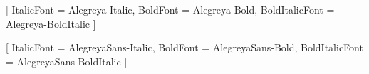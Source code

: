 



\usepackage[babelshorthands]{polyglossia}
\setmainlanguage[indentfirst=false]{russian}

\usepackage{fontspec}


\setmainfont{Alegreya-Regular}[
	ItalicFont = Alegreya-Italic,
	BoldFont = Alegreya-Bold,
	BoldItalicFont = Alegreya-BoldItalic
]


\setsansfont{AlegreyaSans-Regular}[
	ItalicFont = AlegreyaSans-Italic,
	BoldFont = AlegreyaSans-Bold,
	BoldItalicFont = AlegreyaSans-BoldItalic
]





\usepackage{pifont}

\newcommand{\customdelim}{%
	\begin{center}
		\Large 
		\ding{167}
	\end{center}}

\usepackage{microtype}
\midsloppy

\usepackage[all]{nowidow}
\setnoclub
\setnowidow

\usepackage{enotez}


